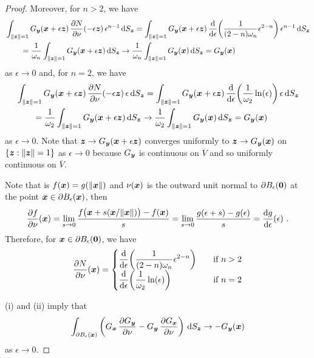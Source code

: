 \begin{proof}
Moreover, for $n>2$, we have
\begin{align*}
&\int_{\|{\bm{z}}\|=1}
G_{{\bm{y}}}({\bm{x}}+\epsilon {\bm{z}})
\,\frac{\partial{N}}{\partial \nu}(-\epsilon {\bm{z}}) \, \epsilon^{n-1}\,\mathrm{d}{S}_{{\bm{z}}}
= \int_{\|{\bm{z}}\|=1} G_{{\bm{y}}}({\bm{x}}+\epsilon {\bm{z}})
\,\frac{\mathrm{d}}{\mathrm{d}{\epsilon}}{ \left(\frac{1}{(2-n)\omega_n} \epsilon^{2-n}\right) }
\, \epsilon^{n-1}\,\mathrm{d}{S}_{{\bm{z}}} \\
&\qquad = \frac{1}{\omega_n} \int_{\|{\bm{z}}\|=1}
G_{{\bm{y}}}({\bm{x}}+\epsilon {\bm{z}}) \,\mathrm{d}{S}_{{\bm{z}}}
\to 
\frac{1}{\omega_n} \int_{\|{\bm{z}}\|=1} G_{{\bm{y}}}({\bm{x}}) \,\mathrm{d}{S}_{{\bm{z}}}
= G_{{\bm{y}}}({\bm{x}})
\end{align*}
as $\epsilon \to 0$ and, for $n=2$, we have
\begin{align*}
&\int_{\|{\bm{z}}\|=1}
G_{{\bm{y}}}({\bm{x}}+\epsilon {\bm{z}})
\,\frac{\partial{N}}{\partial \nu}(-\epsilon {\bm{z}}) \, \epsilon \,\mathrm{d}{S}_{{\bm{z}}}
= \int_{\|{\bm{z}}\|=1} G_{{\bm{y}}}({\bm{x}}+\epsilon {\bm{z}})
\,\frac{\mathrm{d}}{\mathrm{d}{\epsilon}}{ \left(\frac{1}{\omega_2} \ln(\epsilon) \right) }
\, \epsilon \,\mathrm{d}{S}_{{\bm{z}}} \\
& \qquad = \frac{1}{\omega_2} \int_{\|{\bm{z}}\|=1}
G_{{\bm{y}}}({\bm{x}}+\epsilon {\bm{z}}) \,\mathrm{d}{S}_{{\bm{z}}}
\to
\frac{1}{\omega_2} \int_{\|{\bm{z}}\|=1} G_{{\bm{y}}}({\bm{x}}) \,\mathrm{d}{S}_{{\bm{z}}}
= G_{{\bm{y}}}({\bm{x}})
\end{align*}
as $\epsilon \to 0$.
Note that ${\bm{z}} \to G_{{\bm{y}}}({\bm{x}}+\epsilon {\bm{z}})$
converges uniformly to ${\bm{z}} \to G_{{\bm{y}}}({\bm{x}})$ on
$\{ {\bm{z}} : \|{\bm{z}}\| = 1\}$ as $\epsilon \to 0$ because
$G_{{\bm{y}}}$ is continuous on $\overline{V}$ and so uniformly continuous
on $\overline{V}$.

Note that is $f({\bm{x}}) = g(\|{\bm{x}}\|)$ and $\nu({\bm{x}})$ is
the outward unit normal to $\partial B_\epsilon({\bm{0}})$ at the point
${\bm{x}} \in \partial B_\epsilon({\bm{x}})$, then
\[
\frac{\partial{f}}{\partial \nu}({\bm{x}}) = \lim_{s\to 0}
\frac{f\big({\bm{x}} + s({\bm{x}}/\|{\bm{x}}\|)\big) - f({\bm{x}})}{s}
= \lim_{s\to 0} \frac{g(\epsilon + s) - g(\epsilon)}{s}
= \frac{\mathrm{d}g}{\mathrm{d}{\epsilon}}(\epsilon) \ .
\]
Therefore, for ${\bm{x}} \in \partial B_\epsilon({\bm{0}})$, we have
\[
\frac{\partial{N}}{\partial \nu}({\bm{x}})
= \begin{cases}
\displaystyle
\frac{\mathrm{d}}{\mathrm{d}{\epsilon}}{ \left(\frac{1}{(2-n)\omega_n} \epsilon^{2-n}\right) }
& \quad \text{if} \ n>2 \\
\displaystyle
\frac{\mathrm{d}}{\mathrm{d}{\epsilon}}{ \left(\frac{1}{\omega_2} \ln(\epsilon) \right) }
&\quad \text{if} \ n = 2
\end{cases}
\]

(i) and (ii) imply that 
\begin{equation} \label{laplace_GequG_two_A}
\int_{\partial B_{\epsilon}({\bm{x}})}
\left( G_{{\bm{x}}}\,\frac{\partial{G_{{\bm{y}}}}}{\partial \nu} 
- G_{{\bm{y}}}\,\frac{\partial{G_{{\bm{x}}}}}{\partial \nu} \right) \,\mathrm{d}{S}_{{\bm{z}}}
\to -G_{{\bm{y}}}({\bm{x}})
\end{equation}
as $\epsilon \to 0$.


\end{proof}
